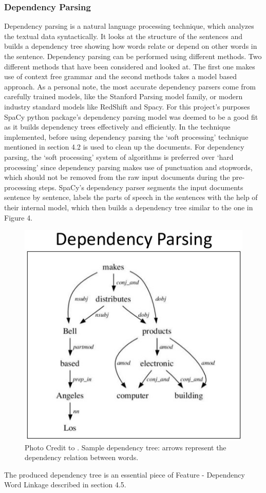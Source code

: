 \documentclass{sig-alternate}
\begin{document}
\subsubsection{Dependency Parsing}
Dependency parsing is a natural language processing technique, which analyzes the textual data syntactically. It looks at the structure of the sentences and builds a dependency tree showing how words relate or depend on other words in the sentence. Dependency parsing can be performed using different methods. Two different methods that have been considered and looked at. The first one makes use of context free grammar\cite{BirdKleinLoper2009} and the second methods takes a model based approach. As a personal note, the most accurate dependency parsers come from carefully trained models, like the Stanford Parsing model family\cite{ChenManning2014}, or modern industry standard models like RedShift\cite{Honnibal2013} and Spacy\cite{Honnibal2017}. For this project's purposes SpaCy python package's dependency parsing model was deemed to be a good fit as it builds dependency trees effectively and efficiently. 
In the technique implemented, before using dependency parsing the `soft processing' technique mentioned in section 4.2 is used to clean up the documents. For dependency parsing, the `soft processing' system of algorithms is preferred over `hard processing' since dependency parsing makes use of punctuation and stopwords, which should not be removed from the raw input documents during the pre-processing steps. SpaCy's dependency parser\cite{Honnibal2017} segments the input documents sentence by sentence, labels the parts of speech in the sentences with the help of their internal model, which then builds a dependency tree similar to the one in Figure 4.


\begin{figure}
\centering
\includegraphics[scale=0.60]{images/dependency-parsing.jpg}
\caption{Photo Credit to \cite{Bird2015}. Sample dependency tree: arrows represent the dependency relation between words.}
\end{figure}
The produced dependency tree is an essential piece of Feature - Dependency Word Linkage described in section 4.5.
\end{document}
